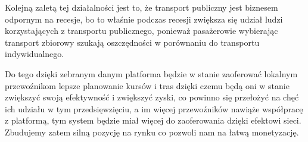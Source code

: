 Kolejną zaletą tej działalności jest to, że transport publiczny jest biznesem odpornym na recesje, bo to właśnie podczas recesji zwiększa się udział ludzi korzystających z transportu publicznego, ponieważ pasażerowie wybierając transport zbiorowy szukają oszczędności w porównaniu do transportu indywidualnego.

Do tego dzięki zebranym danym platforma będzie w stanie zaoferować lokalnym przewoźnikom lepsze planowanie kursów i tras dzięki czemu będą oni w stanie zwiększyć swoją efektywność i zwiększyć zyski, co powinno się przełożyć na chęć ich udziału w tym przedsięwzięciu, a im więcej przewoźników nawiąże współpracę z platformą, tym system będzie miał więcej do zaoferowania dzięki efektowi sieci. Zbudujemy zatem silną pozycję na rynku co pozwoli nam na łatwą monetyzację.
